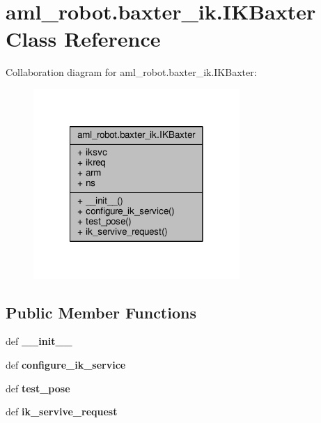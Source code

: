\hypertarget{classaml__robot_1_1baxter__ik_1_1_i_k_baxter}{\section{aml\-\_\-robot.\-baxter\-\_\-ik.\-I\-K\-Baxter Class Reference}
\label{classaml__robot_1_1baxter__ik_1_1_i_k_baxter}
}


Collaboration diagram for aml\-\_\-robot.\-baxter\-\_\-ik.\-I\-K\-Baxter\-:\nopagebreak
\begin{figure}[H]
\begin{center}
\leavevmode
\includegraphics[width=222pt]{classaml__robot_1_1baxter__ik_1_1_i_k_baxter__coll__graph}
\end{center}
\end{figure}
\subsection*{Public Member Functions}
\begin{DoxyCompactItemize}
\item 
\hypertarget{classaml__robot_1_1baxter__ik_1_1_i_k_baxter_acdcbd683c692f89daec2685a9ec2e623}{def {\bfseries \-\_\-\-\_\-init\-\_\-\-\_\-}}\label{classaml__robot_1_1baxter__ik_1_1_i_k_baxter_acdcbd683c692f89daec2685a9ec2e623}

\item 
\hypertarget{classaml__robot_1_1baxter__ik_1_1_i_k_baxter_a6985adef358e80b1924292508a707a66}{def {\bfseries configure\-\_\-ik\-\_\-service}}\label{classaml__robot_1_1baxter__ik_1_1_i_k_baxter_a6985adef358e80b1924292508a707a66}

\item 
\hypertarget{classaml__robot_1_1baxter__ik_1_1_i_k_baxter_a87fb9334e61c8d42b4ff2c5e00402b98}{def {\bfseries test\-\_\-pose}}\label{classaml__robot_1_1baxter__ik_1_1_i_k_baxter_a87fb9334e61c8d42b4ff2c5e00402b98}

\item 
\hypertarget{classaml__robot_1_1baxter__ik_1_1_i_k_baxter_a306f472f1d9fd2105c6d42f092bf476c}{def {\bfseries ik\-\_\-servive\-\_\-request}}\label{classaml__robot_1_1baxter__ik_1_1_i_k_baxter_a306f472f1d9fd2105c6d42f092bf476c}

\end{DoxyCompactItemize}
